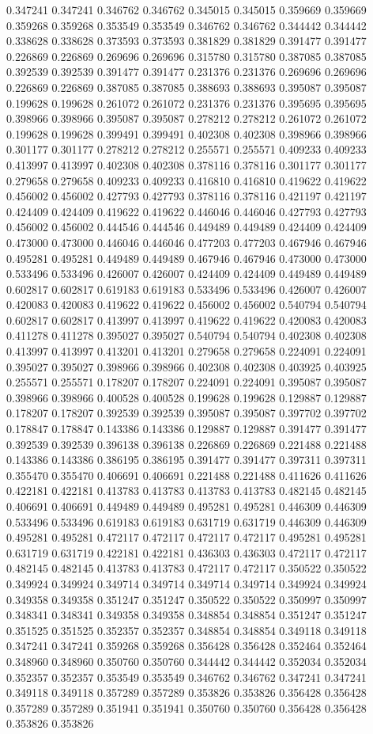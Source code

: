 0.347241 0.347241 0.346762 0.346762 0.345015 0.345015 0.359669 0.359669 0.359268 0.359268 0.353549 0.353549 0.346762 0.346762 0.344442 0.344442 0.338628 0.338628 0.373593 0.373593 0.381829 0.381829 0.391477 0.391477 0.226869 0.226869 0.269696 0.269696 0.315780 0.315780 0.387085 0.387085 0.392539 0.392539 0.391477 0.391477 0.231376 0.231376 0.269696 0.269696 0.226869 0.226869 0.387085 0.387085 0.388693 0.388693 0.395087 0.395087 0.199628 0.199628 0.261072 0.261072 0.231376 0.231376 0.395695 0.395695 0.398966 0.398966 0.395087 0.395087 0.278212 0.278212 0.261072 0.261072 0.199628 0.199628 0.399491 0.399491 0.402308 0.402308 0.398966 0.398966 0.301177 0.301177 0.278212 0.278212 0.255571 0.255571 0.409233 0.409233 0.413997 0.413997 0.402308 0.402308 0.378116 0.378116 0.301177 0.301177 0.279658 0.279658 0.409233 0.409233 0.416810 0.416810 0.419622 0.419622 0.456002 0.456002 0.427793 0.427793 0.378116 0.378116 0.421197 0.421197 0.424409 0.424409 0.419622 0.419622 0.446046 0.446046 0.427793 0.427793 0.456002 0.456002 0.444546 0.444546 0.449489 0.449489 0.424409 0.424409 0.473000 0.473000 0.446046 0.446046 0.477203 0.477203 0.467946 0.467946 0.495281 0.495281 0.449489 0.449489 0.467946 0.467946 0.473000 0.473000 0.533496 0.533496 0.426007 0.426007 0.424409 0.424409 0.449489 0.449489 0.602817 0.602817 0.619183 0.619183 0.533496 0.533496 0.426007 0.426007 0.420083 0.420083 0.419622 0.419622 0.456002 0.456002 0.540794 0.540794 0.602817 0.602817 0.413997 0.413997 0.419622 0.419622 0.420083 0.420083 0.411278 0.411278 0.395027 0.395027 0.540794 0.540794 0.402308 0.402308 0.413997 0.413997 0.413201 0.413201 0.279658 0.279658 0.224091 0.224091 0.395027 0.395027 0.398966 0.398966 0.402308 0.402308 0.403925 0.403925 0.255571 0.255571 0.178207 0.178207 0.224091 0.224091 0.395087 0.395087 0.398966 0.398966 0.400528 0.400528 0.199628 0.199628 0.129887 0.129887 0.178207 0.178207 0.392539 0.392539 0.395087 0.395087 0.397702 0.397702 0.178847 0.178847 0.143386 0.143386 0.129887 0.129887 0.391477 0.391477 0.392539 0.392539 0.396138 0.396138 0.226869 0.226869 0.221488 0.221488 0.143386 0.143386 0.386195 0.386195 0.391477 0.391477 0.397311 0.397311 0.355470 0.355470 0.406691 0.406691 0.221488 0.221488 0.411626 0.411626 0.422181 0.422181 0.413783 0.413783 0.413783 0.413783 0.482145 0.482145 0.406691 0.406691 0.449489 0.449489 0.495281 0.495281 0.446309 0.446309 0.533496 0.533496 0.619183 0.619183 0.631719 0.631719 0.446309 0.446309 0.495281 0.495281 0.472117 0.472117 0.472117 0.472117 0.495281 0.495281 0.631719 0.631719 0.422181 0.422181 0.436303 0.436303 0.472117 0.472117 0.482145 0.482145 0.413783 0.413783 0.472117 0.472117 0.350522 0.350522 0.349924 0.349924 0.349714 0.349714 0.349714 0.349714 0.349924 0.349924 0.349358 0.349358 0.351247 0.351247 0.350522 0.350522 0.350997 0.350997 0.348341 0.348341 0.349358 0.349358 0.348854 0.348854 0.351247 0.351247 0.351525 0.351525 0.352357 0.352357 0.348854 0.348854 0.349118 0.349118 0.347241 0.347241 0.359268 0.359268 0.356428 0.356428 0.352464 0.352464 0.348960 0.348960 0.350760 0.350760 0.344442 0.344442 0.352034 0.352034 0.352357 0.352357 0.353549 0.353549 0.346762 0.346762 0.347241 0.347241 0.349118 0.349118 0.357289 0.357289 0.353826 0.353826 0.356428 0.356428 0.357289 0.357289 0.351941 0.351941 0.350760 0.350760 0.356428 0.356428 0.353826 0.353826 